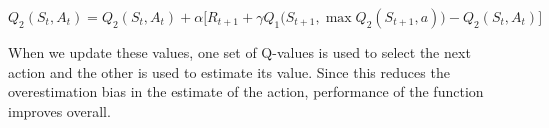 \documentclass{article}
\begin{document}
\begin{equation}
Q_2(S_t, A_t) = Q_2(S_t, A_t) + \alpha \biggl[ R_{t+1} + \gamma Q_1 \bigl( S_{t+1}, \max Q_2(S_{t+1}, a) \bigr) - Q_2(S_t, A_t) \biggr]
\end{equation}

When we update these values, one set of Q-values is used to select the next action and the other is used to estimate its value. Since this reduces the overestimation bias in the estimate of the action, performance of the function improves overall.
\end{document}
